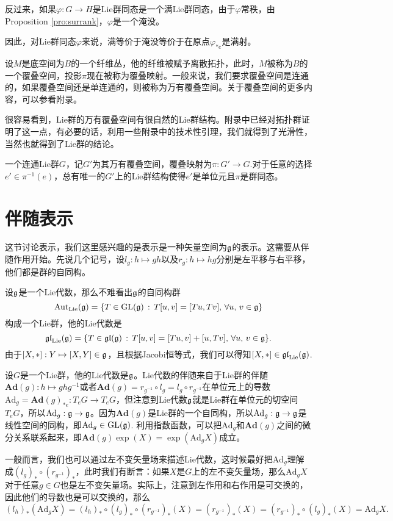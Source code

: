 反过来，如果$\varphi:G\to H$是Lie群同态是一个满Lie群同态，由于$\varphi$常秩，由Proposition \ref{pro:surrank}，$\varphi$是一个淹没。

因此，对Lie群同态$\varphi$来说，满等价于淹没等价于在原点$\varphi_{*e}$是满射。

\para \label{covering_space}设$M$是底空间为$B$的一个纤维丛，他的纤维被赋予离散拓扑，此时，$M$被称为$B$的一个覆叠空间，投影$\pi$现在被称为覆叠映射。一般来说，我们要求覆叠空间是连通的，如果覆叠空间还是单连通的，则被称为万有覆叠空间。关于覆叠空间的更多内容，可以参看附录。

很容易看到，Lie群的万有覆叠空间有很自然的Lie群结构。附录中已经对拓扑群证明了这一点，有必要的话，利用一些附录中的技术性引理，我们就得到了光滑性，当然也就得到了Lie群的结论。

\para 一个连通Lie群$G$，记$G'$为其万有覆叠空间，覆叠映射为$\pi:G'\to G$.对于任意的选择$e'\in \pi^{-1}(e)$，总有唯一的$G'$上的Lie群结构使得$e'$是单位元且$\pi$是群同态。

\section{伴随表示}

这节讨论表示，我们这里感兴趣的是表示是一种矢量空间为${\mathfrak{g}}$的表示。这需要从伴随作用开始。先说几个记号，设$l_g:h\mapsto gh$以及$r_g:h\mapsto hg$分别是左平移与右平移，他们都是群的自同构。

\para 设${\mathfrak{g}}$是一个Lie代数，那么不难看出${\mathfrak{g}}$的自同构群
\[\mathrm{Aut}_{\mathrm{Lie}}({\mathfrak{g}})=\{T\in \mathrm{GL}({\mathfrak{g}})\,:\,T[u,v]=[Tu,Tv],\,\forall u,\,v\in{\mathfrak{g}}\}\]
构成一个Lie群，他的Lie代数是
\[\mathfrak{gl}_{\mathrm{Lie}}({\mathfrak{g}})=\{T\in \mathfrak{gl}({\mathfrak{g}})\,:\,T[u,v]=[Tu,v]+[u,Tv],\,\forall u,\,v\in{\mathfrak{g}}\}.\]
由于$[X,*]:Y\mapsto [X,Y]\in {\mathfrak{g}}$，且根据Jacobi恒等式，我们可以得知$[X,*]\in \mathfrak{gl}_{\mathrm{Lie}}({\mathfrak{g}})$.

\para 设$G$是一个Lie群，他的Lie代数是${\mathfrak{g}}$。Lie代数的伴随来自于Lie群的伴随$\mathbf{Ad}(g):h\mapsto ghg^{-1}$或者$\mathbf{Ad}(g)=r_{g^{-1}}\circ l_g=l_g\circ r_{g^{-1}}$在单位元上的导数$\mathrm{Ad}_g=\mathbf{Ad}(g)_{*e}:T_eG\to T_eG$，但注意到Lie代数${\mathfrak{g}}$就是Lie群在单位元的切空间$T_eG$，所以$\mathrm{Ad}_g:{\mathfrak{g}}\to {\mathfrak{g}}$。因为$\mathbf{Ad}(g)$是Lie群的一个自同构，所以$\mathrm{Ad}_g:{\mathfrak{g}}\to{\mathfrak{g}}$是线性空间的同构，即$\mathrm{Ad}_g\in \mathrm{GL}({\mathfrak{g}})$. 利用指数函数，可以把$\mathrm{Ad}_g$和$\mathbf{Ad}(g)$之间的微分关系联系起来，即$\mathbf{Ad}(g)\exp(X)=\exp(\mathrm{Ad}_gX)$成立。

\para 一般而言，我们也可以通过左不变矢量场来描述Lie代数，这时候最好把$\mathrm{Ad}_g$理解成$(l_g)_*\circ (r_{g^{-1}})_*$，此时我们有断言：如果$X$是$G$上的左不变矢量场，那么$\mathrm{Ad}_gX$对于任意$g\in G$也是左不变矢量场。实际上，注意到左作用和右作用是可交换的，因此他们的导数也是可以交换的，那么
\[
	(l_h)_*(\mathrm{Ad}_gX)=(l_h)_*\circ (l_g)_*\circ (r_{g^{-1}})_*(X)=(r_{g^{-1}})_*(X)=(r_{g^{-1}})_*\circ (l_g)_*(X)=\mathrm{Ad}_gX.
\]

